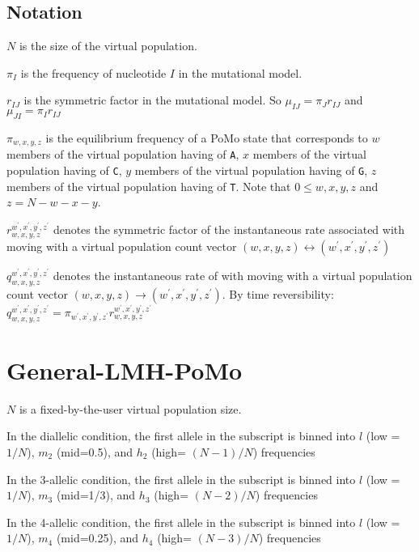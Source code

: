 \documentclass{llncs}
\begin{document}
\subsection*{Notation}
\begin{compactenum}
    \item $N$ is the size of the virtual population.
    \item $\pi_I$ is the frequency of nucleotide $I$ in the mutational model.
    \item $r_{IJ}$ is the symmetric factor in the mutational model. So $\mu_{IJ} = \pi_J r_{IJ}$ and $\mu_{JI} = \pi_I r_{IJ}$
    \item $\pi_{w,x,y,z}$ is the equilibrium frequency of a PoMo state that corresponds to
        $w$ members of the virtual population having of \texttt{A}, 
        $x$ members of the virtual population having of \texttt{C},
        $y$ members of the virtual population having of \texttt{G}, 
        $z$ members of the virtual population having of \texttt{T}. Note that $0\leq w, x, y, z$ and
        $z = N- w- x-y$.
    \item $r_{w,x,y,z}^{w^\prime,x^\prime,y^\prime,z^\prime}$ denotes the symmetric factor of the instantaneous rate associated with moving with a virtual population count vector $(w,x,y,z)\leftrightarrow\left({w^\prime,x^\prime,y^\prime,z^\prime}\right)$
    \item $q_{w,x,y,z}^{w^\prime, x^\prime, y^\prime, z^\prime}$ denotes the
    instantaneous rate of with moving with a virtual population count vector $(w,x,y,z)\rightarrow\left({w^\prime,x^\prime,y^\prime,z^\prime}\right)$.
    By time reversibility:
    $q_{w,x,y,z}^{w^\prime, x^\prime, y^\prime, z^\prime} = \pi_{w^\prime, x^\prime, y^\prime, z^\prime} r_{w,x,y,z}^{w^\prime,x^\prime,y^\prime,z^\prime}$
\end{compactenum}

\section*{General-LMH-PoMo}
\begin{compactenum}
    \item $N$ is a fixed-by-the-user virtual population size.
    \item In the diallelic condition, the first allele in the subscript is binned into $l$ (low = $1/N$), $m_2$ (mid=0.5), and $h_2$ (high= $(N-1)/N$) frequencies
    \item In the 3-allelic condition, the first allele in the subscript is binned into $l$ (low = $1/N$), $m_3$ (mid=1/3), and $h_3$ (high= $(N-2)/N$) frequencies
    \item In the 4-allelic condition, the first allele in the subscript is binned into $l$ (low = $1/N$), $m_4$ (mid=0.25), and $h_4$ (high= $(N-3)/N$) frequencies
\end{compactenum}
\end{document}
